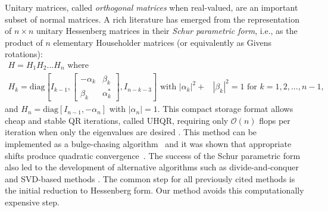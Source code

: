 \documentclass[10pt,twoside,dvipsnames]{siamart1116}
\numberwithin{algorithm}{section}
\numberwithin{equation}{section}
\begin{document}
Unitary matrices, called \emph{orthogonal matrices} when real-valued, are an important subset of normal matrices. A rich literature has emerged from the representation of $n\times n$ unitary Hessenberg matrices in their \emph{Schur parametric form}, i.e., as the product of $n$ elementary Householder matrices (or equivalently as Givens rotations): 
\begin{align*}
	 H = H_1H_2...H_n  \text{ where }&\\
	 H_k=\mathrm{diag}\left[I_{k-1},\begin{bmatrix}-\alpha_k&\beta_k\\\beta_k&\alpha_k^*
	\end{bmatrix}, I_{n-k-3} \right] \text{ with } |\alpha_k|^2 + &|\beta_k|^2=1 \text{ for } k=1,2,...,n-1,
\end{align*}
 and $H_n =\mathrm{diag}\left[I_{n-1},-\alpha_n\right]$ with $|\alpha_n|=1$. This compact storage format allows cheap and stable QR iterations, called UHQR, requiring only $\mathcal{O}(n)$ flops per iteration when only the eigenvalues are desired \cite{GRAGG19861, Stewart2006}. This method can be implemented as a bulge-chasing algorithm~\cite{Aurentz2015} and it was shown that appropriate shifts produce quadratic convergence~\cite{wanggragg02,wanggragg01}. The success of the Schur parametric form also led to the development of alternative algorithms such as divide-and-conquer \cite{graggreichel90,GuGuzzo2003} and SVD-based methods \cite{AmmarReichel86,CALVETTI2015}. The common step for all previously cited methods is the initial reduction to Hessenberg form. Our method avoids this computationally expensive step.%

\end{document}
